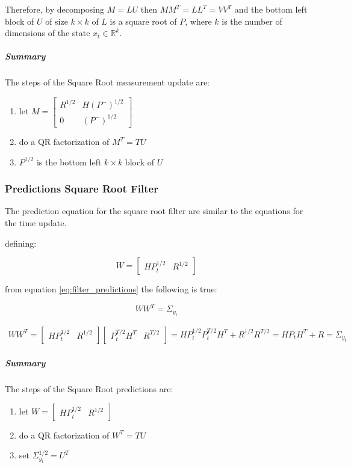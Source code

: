 \documentclass{article}
\begin{document}
Therefore, by decomposing $M=LU$ then $MM^T=LL^T=VV^T$ and the bottom left block of $U$ of size $k \times k$ of $L$ is a square root of $P$, where $k$ is the number of dimensions of the state $x_t \in \mathbb{R}^k$.

\subparagraph{Summary} The steps of the Square Root measurement update are:
\begin{enumerate}
 \item let $M = \begin{bmatrix} R^{1/2} & H(P^-)^{1/2} \\ 0 & (P^-)^{1/2} \end{bmatrix}$
 \item do a QR factorization of $M^T=TU$
 \item $P^{1/2}$ is the bottom left $k \times k$ block of $U$
\end{enumerate}

\subsubsection{Predictions Square Root Filter}

The prediction equation for the square root filter are similar to the equations for the time update.

defining:

\begin{equation}
    W = \begin{bmatrix}HP_{t}^{1/2} & R^{1/2}\end{bmatrix}
\end{equation}

from equation \ref{eq:filter_predictions} the following is true:

\begin{equation}\label{predict_SR_mult}
WW^T = \Sigma_{y_t} 
\end{equation}

\begin{multline}
  WW^T =  \begin{bmatrix}HP_{t}^{1/2} & R^{1/2}\end{bmatrix}\begin{bmatrix}P_{t}^{T/2}H^T & R^{T/2}\end{bmatrix}
  = HP_{t}^{1/2}P_{t}^{T/2}H^T + R^{1/2}R^{T/2} = HP_{t}H^T + R = \Sigma_{y_t}
\end{multline}

\subparagraph{Summary} The steps of the Square Root predictions are:

\begin{enumerate}
    \item let  $W = \begin{bmatrix}HP_t^{1/2} & R^{1/2}\end{bmatrix}$
    \item do a QR factorization of $W^T=TU$
    \item set $\Sigma_{y_t}^{1/2} = U^T$
\end{enumerate}
\end{document}
